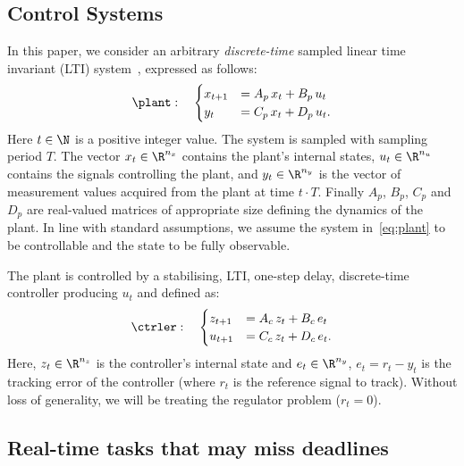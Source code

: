 \subsection{Control Systems}
\label{ssec:systemmodel}
In this paper, we consider an arbitrary \emph{discrete-time} sampled linear time invariant (LTI) system~\cite{Astrom:1997}, expressed as follows:
%
\begin{equation}
    \label{eq:plant}
    \plant:\quad
    \begin{cases}
        x_{t+1} &= A_p\,x_t + B_p\,u_t \\
        y_{t} &= C_p\,x_t + D_p\,u_t.
    \end{cases}
\end{equation}
%
Here $t\in\N$ is a positive integer value.
The system is sampled with sampling period $T$.
The vector $x_t\in\R^{n_x}$ contains the plant's internal states, $u_t\in\R^{n_u}$ contains the signals controlling the plant, and $y_t\in\R^{n_y}$ is the vector of measurement values acquired from the plant at time $t\cdot T$. Finally $A_p$, $B_p$, $C_p$ and $D_p$ are real-valued matrices of appropriate size defining the dynamics of the plant.
In line with standard assumptions, we assume the system in~\eqref{eq:plant} to be controllable and the state to be fully observable.

The plant is controlled by a stabilising, LTI, one-step delay, discrete-time controller producing $u_t$ and defined as:
%
\begin{equation}
    \label{eq:controller}
    \ctrler:\quad
    \begin{cases}
        z_{t+1} &= A_c\,z_t + B_c\,e_t \\
        u_{t+1} &= C_c\,z_t + D_c\,e_t.
    \end{cases}
\end{equation}
%
Here, $z_t\in\R^{n_z}$ is the controller's internal state and $e_t\in\R^{n_y}$, $e_t= r_t - y_t$ is the tracking error of the controller (where $r_t$ is the reference signal to track).
Without loss of generality, we will be treating the regulator problem ($r_t = 0$).

\subsection{Real-time tasks that may miss deadlines}
\label{ssec:whalgebra}

